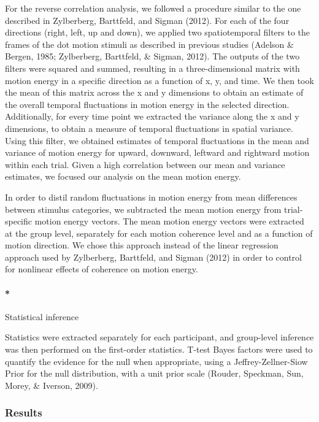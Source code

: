 \documentclass[
  english,
  man]{apa6}
\let\oldparagraph\paragraph
\renewcommand{\paragraph}[1]{\oldparagraph{#1}\mbox{}}
\begin{document}
For the reverse correlation analysis, we followed a procedure similar to the one described in Zylberberg, Barttfeld, and Sigman (2012). For each of the four directions (right, left, up and down), we applied two spatiotemporal filters to the frames of the dot motion stimuli as described in previous studies (Adelson \& Bergen, 1985; Zylberberg, Barttfeld, \& Sigman, 2012). The outputs of the two filters were squared and summed, resulting in a three-dimensional matrix with motion energy in a specific direction as a function of x, y, and time. We then took the mean of this matrix across the x and y dimensions to obtain an estimate of the overall temporal fluctuations in motion energy in the selected direction. Additionally, for every time point we extracted the variance along the x and y dimensions, to obtain a measure of temporal fluctuations in spatial variance. Using this filter, we obtained estimates of temporal fluctuations in the mean and variance of motion energy for upward, downward, leftward and rightward motion within each trial. Given a high correlation between our mean and variance estimates, we focused our analysis on the mean motion energy.

In order to distil random fluctuations in motion energy from mean differences between stimulus categories, we subtracted the mean motion energy from trial-specific motion energy vectors. The mean motion energy vectors were extracted at the group level, separately for each motion coherence level and as a function of motion direction. We chose this approach instead of the linear regression approach used by Zylberberg, Barttfeld, and Sigman (2012) in order to control for nonlinear effects of coherence on motion energy.

\hypertarget{statistical-inference}{%
\paragraph*{Statistical inference}\label{statistical-inference}}

Statistics were extracted separately for each participant, and group-level inference was then performed on the first-order statistics. T-test Bayes factors were used to quantify the evidence for the null when appropriate, using a Jeffrey-Zellner-Siow Prior for the null distribution, with a unit prior scale (Rouder, Speckman, Sun, Morey, \& Iverson, 2009).

\hypertarget{results}{%
\subsubsection{Results}\label{results}}
\end{document}
